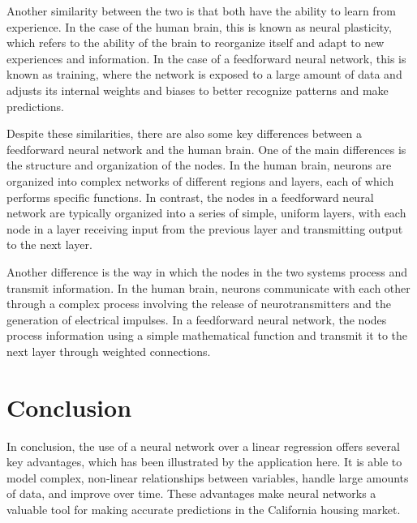 \documentclass[11pt]{article}
\begin{document}
Another similarity between the two is that both have the ability to learn from experience. In the case of the human brain, this is known as neural plasticity, which refers to the ability of the brain to reorganize itself and adapt to new experiences and information. In the case of a feedforward neural network, this is known as training, where the network is exposed to a large amount of data and adjusts its internal weights and biases to better recognize patterns and make predictions.

Despite these similarities, there are also some key differences between a feedforward neural network and the human brain. One of the main differences is the structure and organization of the nodes. In the human brain, neurons are organized into complex networks of different regions and layers, each of which performs specific functions. In contrast, the nodes in a feedforward neural network are typically organized into a series of simple, uniform layers, with each node in a layer receiving input from the previous layer and transmitting output to the next layer.

Another difference is the way in which the nodes in the two systems process and transmit information. In the human brain, neurons communicate with each other through a complex process involving the release of neurotransmitters and the generation of electrical impulses. In a feedforward neural network, the nodes process information using a simple mathematical function and transmit it to the next layer through weighted connections.

\section{Conclusion}
In conclusion, the use of a neural network over a linear regression offers several key advantages, which has been illustrated by the application here. It is able to model complex, non-linear relationships between variables, handle large amounts of data, and improve over time. These advantages make neural networks a valuable tool for making accurate predictions in the California housing market.

\nocite{Cetkovic2018, Geron2022, Pow2014}

\newpage
\end{document}
